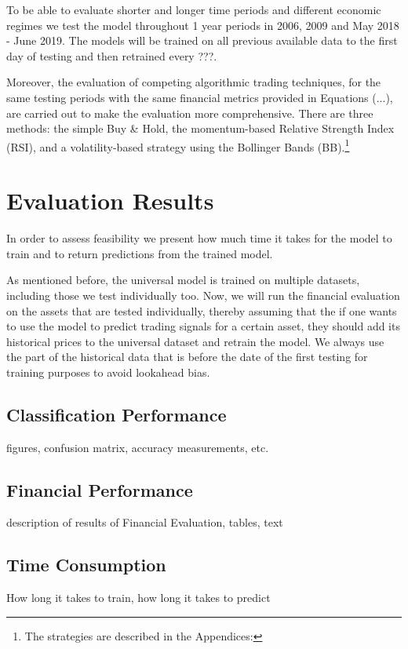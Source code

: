 \documentclass[11pt, a4paper]{article}
\begin{document}
To be able to evaluate shorter and longer time periods and different economic regimes we test the model throughout 1 year periods in 2006, 2009 and May 2018 - June 2019. The models will be trained on all previous available data to the first day of testing and then retrained every ???. 

Moreover, the evaluation of competing algorithmic trading techniques, for the same testing periods with the same financial metrics provided in Equations (...), are carried out to make the evaluation more comprehensive.
There are three methods: the simple Buy \& Hold, the momentum-based Relative Strength Index (RSI), and a volatility-based strategy using the Bollinger Bands (BB).\footnote{The strategies are described in the Appendices: }

\section{Evaluation Results}
\label{sec:ER}

In order to assess feasibility we present how much time it takes for the model to train and to return predictions from the trained model. 

As mentioned before, the universal model is trained on multiple datasets, including those we test individually too. Now, we will run the financial evaluation on the assets that are tested individually, thereby assuming that the if one wants to use the model to predict trading signals for a certain asset, they should add its historical prices to the universal dataset and retrain the model.
We always use the part of the historical data that is before the date of the first testing for training purposes to avoid lookahead bias.

\subsection{Classification Performance}
\label{subsec:ER:ClassPerf}
figures, confusion matrix, accuracy measurements, etc.

\subsection{Financial Performance}
\label{subsec:ER:FinPerf}
description of results of Financial Evaluation, tables, text

\subsection{Time Consumption}
\label{subsec:ER:TimePerf}
How long it takes to train, how long it takes to predict
\end{document}
